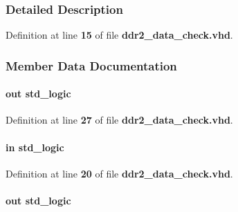\subsubsection{Detailed Description}


Definition at line {\bf 15} of file {\bf ddr2\+\_\+data\+\_\+check.\+vhd}.



\subsubsection{Member Data Documentation}
\paragraph[{all\+\_\+match}]{ {\bfseries \textcolor{keywordflow}{out}\textcolor{vhdlchar}{ }} {\bfseries \textcolor{comment}{std\+\_\+logic}\textcolor{vhdlchar}{ }} \hspace{0.3cm}{\ttfamily [Port]}}\label{classddr2__data__check_a8a723f3c644b647f1379bb08374790a7}


Definition at line {\bf 27} of file {\bf ddr2\+\_\+data\+\_\+check.\+vhd}.

\paragraph[{clk}]{ {\bfseries \textcolor{keywordflow}{in}\textcolor{vhdlchar}{ }} {\bfseries \textcolor{comment}{std\+\_\+logic}\textcolor{vhdlchar}{ }} \hspace{0.3cm}{\ttfamily [Port]}}\label{classddr2__data__check_a4a4609c199d30b3adebbeb3a01276ec5}


Definition at line {\bf 20} of file {\bf ddr2\+\_\+data\+\_\+check.\+vhd}.

\paragraph[{current\+\_\+match}]{ {\bfseries \textcolor{keywordflow}{out}\textcolor{vhdlchar}{ }} {\bfseries \textcolor{comment}{std\+\_\+logic}\textcolor{vhdlchar}{ }} \hspace{0.3cm}{\ttfamily [Port]}}\label{classddr2__data__check_ae56ed86f4e0247d87187761470eeff80}


